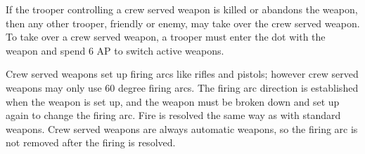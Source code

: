 If the trooper controlling a crew served weapon is killed or abandons the weapon, then any other trooper, friendly or enemy, may take over the crew served weapon.
To take over a crew served weapon, a trooper must enter the dot with the weapon and spend 6 AP to switch active weapons.

Crew served weapons set up firing arcs like rifles and pistols; however crew served weapons may only use 60 degree firing arcs.
The firing arc direction is established when the weapon is set up, and the weapon must be broken down and set up again to change the firing arc.
Fire is resolved the same way as with standard weapons.
Crew served weapons are always automatic weapons, so the firing arc is not removed after the firing is resolved.

